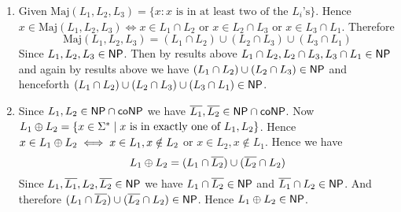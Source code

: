 \documentclass[a4paper, 11pt]{article}
\begin{document}
{\begin{enumerate}[label=(\alph*)]
	\item Given $\text{Maj}(L_1,L_2,L_3)=\{x\colon x\text{ is in at least two of the $L_i$'s}\}.$ Hence $x \in\text{Maj}(L_1,L_2,L_3)\iff x\in L_1\cap L_2$ or $x\in L_2\cap L_3$ or $x\in L_3\cap L_1$. Therefore $$\text{Maj}(L_1,L_2,L_3)=(L_1\cap L_2)\cup (L_2\cap L_3)\cup (L_3\cap L_1)$$Since $L_1,L_2,L_3\in \textsf{N}\textsf{P}$. Then by results above $L_1\cap L_2, L_2\cap L_3,L_3\cap L_1\in\textsf{N}\textsf{P}$ and again by results above we have $(L_1\cap L_2)\cup (L_2\cap L_3)\in\textsf{N}\textsf{P}$ and henceforth $(L_1\cap L_2)\cup (L_2\cap L_3)\cup (L_3\cap L_1)\in \textsf{N}\textsf{P}$.
	\item Since $L_1,L_2\in \textsf{N}\textsf{P}\cap \textsf{coNP}$ we have $\overline{L_1},\overline{L_2}\in \textsf{N}\textsf{P}\cap \textsf{coNP}$. Now $L_1\oplus L_2=\{x\in\Sigma^*\mid x\text{ is in exactly one of $L_1,L_2$}\}$. Hence $x\in L_1\oplus L_2\iff x\in L_1, x\notin L_2$ or $x\in L_2,x\notin L_1$. Hence we have $$L_1\oplus L_2=(L_1\cap \overline{L_2})\cup (\overline{L_2}\cap L_2)$$Since $L_1,\overline{L_1}, L_2,\overline{L_2}\in\textsf{N}\textsf{P}$ we have $L_1\cap \overline{L_2}\in \textsf{N}\textsf{P}$ and $\overline{L_1}\cap L_2\in\textsf{N}\textsf{P}$. And therefore $(L_1\cap \overline{L_2})\cup (\overline{L_2}\cap L_2)\in\textsf{N}\textsf{P}$. Hence $L_1\oplus L_2\in\textsf{N}\textsf{P}$.
\end{enumerate}
 }
\end{document}
